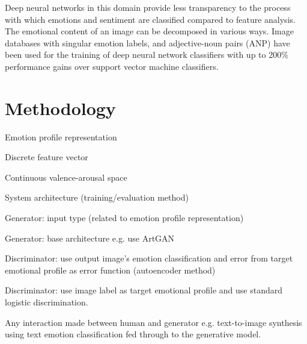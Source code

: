 \documentclass{article}
\begin{document}
Deep neural networks in this domain provide less transparency to the process with which emotions and sentiment are classified compared to feature analysis.
The emotional content of an image can be decomposed in various ways.
Image databases with singular emotion labels, and adjective-noun pairs (ANP) have been used for the training of deep neural network classifiers \citep{chen2014deepsentibank, yang2018visual} with up to 200\% performance gains over support vector machine classifiers.


\section{Methodology}

\begin{todolist}
	\item Emotion profile representation
	\begin{todolist}
		\item Discrete feature vector
		\item Continuous valence-arousal space
	\end{todolist}
	\item System architecture (training/evaluation method)
	\begin{todolist}
		\item Generator: input type (related to emotion profile representation)
		\item Generator: base architecture e.g. use ArtGAN \citep{tan2017artgan}
		\item Discriminator: use output image's emotion classification and error from target emotional profile as error function (autoencoder method)
		\item Discriminator: use image label as target emotional profile and use standard logistic discrimination.
	\end{todolist}
	\item Any interaction made between human and generator e.g. text-to-image synthesis using text emotion classification fed through to the generative model.
	
\end{todolist}
\end{document}
